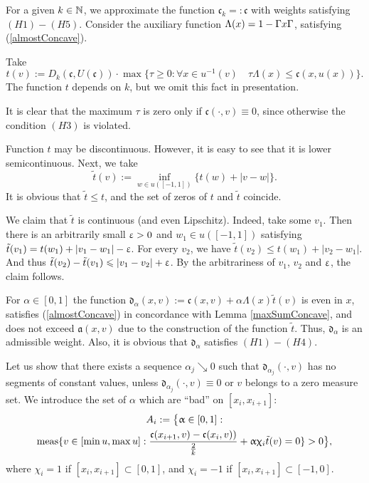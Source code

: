 For a given $k \in \mathbb N$, we approximate the function $\mathfrak c_k =: \mathfrak c$ with weights satisfying $(H1)-(H5)$.
Consider the auxiliary function $\Lambda(x) = 1 - \abs{x}$, satisfying (\ref{almostConcave}).

Take
$$t(v):=D_k(\mathfrak c, U(\mathfrak c)) \cdot \max\{\tau \ge 0: \forall x \in u^{-1}(v) \quad \tau \Lambda(x) \le \mathfrak c(x, u(x))\}.$$
The function $t$ depends on $k$, but we omit this fact in presentation.

It is clear that the maximum $\tau$ is zero only if $\mathfrak c(\cdot, v) \equiv 0$,
since otherwise the condition $(H3)$ is violated.

Function $t$ may be discontinuous. However, it is easy to see that it is lower semicontinuous.
Next, we take
$$\tilde{t}(v) := \inf_{w \in u([-1, 1])} \{t(w) + |v - w|\}.$$
It is obvious that $\tilde{t} \le t$, and the set of zeros of $t$ and $\tilde{t}$ coincide.

We claim that $\tilde{t}$ is continuous (and even Lipschitz).
Indeed, take some $v_1$.
Then there is an arbitrarily small $\upvarepsilon > 0$ and $w_1 \in u([-1, 1])$
satisfying $\tilde{t}(v_1) = t(w_1) + |v_1 - w_1| - \upvarepsilon$.
For every $v_2$, we have $\tilde{t}(v_2) \le t(w_1) + |v_2 - w_1|$.
And thus $\tilde{t}(v_2) - \tilde{t}(v_1) \leqslant |v_1 - v_2| + \upvarepsilon$.
By the arbitrariness of $v_1$, $v_2$ and $\upvarepsilon$, the claim follows.

For $\alpha \in [0, 1]$ the function $\mathfrak d_\alpha(x, v) := \mathfrak c(x, v) + \alpha \Lambda(x) \tilde{t}(v)$
is even in $x$, satisfies (\ref{almostConcave}) in concordance with Lemma \ref{maxSumConcave},
and does not exceed $\mathfrak a(x, v)$ due to the construction of the function $\tilde{t}$.
Thus, $\mathfrak d_\alpha$ is an admissible weight.
Also, it is obvious that $\mathfrak d_\alpha$ satisfies $(H1)-(H4)$.

Let us show that there exists a sequence $\alpha_j \searrow 0$
such that $\mathfrak d_{\alpha_j}(\cdot, v)$ has no segments of constant values,
unless $\mathfrak d_{\alpha_j}(\cdot, v) \equiv 0$ or $v$ belongs to a zero measure set.
We introduce the set of $\alpha$ which are ``bad'' on $[x_i, x_{i + 1}]$:
\begin{multline*}
A_i := \big \{\alpha \in [0, 1]: \\
\meas \{v \in [\min u, \max u]: \frac{\mathfrak c(x_{i + 1}, v) - \mathfrak c(x_i, v))}{\frac{2}{k}} + \alpha \chi_i \tilde{t} (v) = 0 \} > 0 \big \},
\end{multline*}
where $\chi_i = 1$ if $[x_i, x_{i + 1}] \subset [0, 1]$, and $\chi_i = -1$ if $[x_i, x_{i + 1}] \subset [-1, 0]$.

